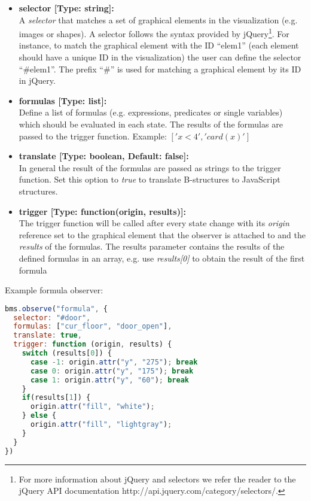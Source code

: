 \begin{itemize}

	\item[] \textbf{selector [Type: string]:}\\ A \textit{selector} that matches a set of graphical elements in the visualization (e.g. images or shapes). 
A selector follows the syntax provided by jQuery\footnote{For more information about jQuery and selectors we refer the reader to the jQuery
API documentation http://api.jquery.com/category/selectors/.}. 
For instance, to match the graphical element with the ID ``elem1'' (each element should have a unique ID in the visualization) the user can define the selector ``\#elem1''.
The prefix ``\#'' is used for matching a graphical element by its ID in jQuery.

\item[] \textbf{formulas [Type: list]:}\\
Define a list of formulas (e.g. expressions, predicates or single variables) which should be evaluated in each state.
The results of the formulas are passed to the trigger function.
Example: $['x < 4', 'card(x)']$

\item[] \textbf{translate [Type: boolean, Default: false]:}\\
In general the result of the formulas are passed as strings to the trigger function.
Set this option to \textit{true} to translate B-structures to JavaScript structures.

\item[] \textbf{trigger [Type: function(origin, results)]:}\\
The trigger function will be called after every state change with its \textit{origin} reference set to the graphical element that the observer is attached to and the \textit{results} of the formulas.
The results parameter contains the results of the defined formulas in an array, e.g. use \textit{results[0]} to obtain the result of the first formula
 
\end{itemize}

Example formula observer:

\begin{lstlisting}[language=JavaScript]
bms.observe("formula", {
  selector: "#door",
  formulas: ["cur_floor", "door_open"],
  translate: true,
  trigger: function (origin, results) {
    switch (results[0]) {
      case -1: origin.attr("y", "275"); break
      case 0: origin.attr("y", "175"); break
      case 1: origin.attr("y", "60"); break
    }
    if(results[1]) {
      origin.attr("fill", "white");
    } else {
      origin.attr("fill", "lightgray");
    }
  }
})
\end{lstlisting}

